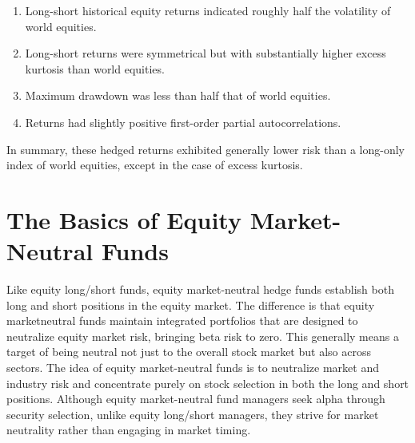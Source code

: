 \documentclass[11pt]{article}
\begin{document}
\begin{enumerate}
  \item Long-short historical equity returns indicated roughly half the volatility of world equities.

  \item Long-short returns were symmetrical but with substantially higher excess kurtosis than world equities.

  \item Maximum drawdown was less than half that of world equities.

  \item Returns had slightly positive first-order partial autocorrelations.

\end{enumerate}

In summary, these hedged returns exhibited generally lower risk than a long-only index of world equities, except in the case of excess kurtosis.

\section*{The Basics of Equity Market-Neutral Funds}
Like equity long/short funds, equity market-neutral hedge funds establish both long and short positions in the equity market. The difference is that equity marketneutral funds maintain integrated portfolios that are designed to neutralize equity market risk, bringing beta risk to zero. This generally means a target of being neutral not just to the overall stock market but also across sectors. The idea of equity market-neutral funds is to neutralize market and industry risk and concentrate purely on stock selection in both the long and short positions. Although equity market-neutral fund managers seek alpha through security selection, unlike equity long/short managers, they strive for market neutrality rather than engaging in market timing.
\end{document}
